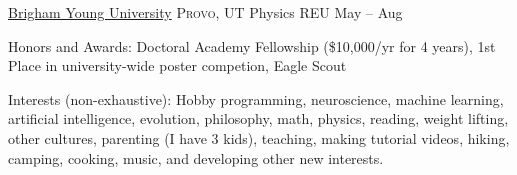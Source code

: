 \documentclass[11pt,a4paper]{article}
\begin{document}
\headedsection
  {\href{http://www.byu.edu}{Brigham Young University}}
  {\textsc{Provo, UT}} {%
	  \headedsubsection
	 {Physics REU}
	 {May  -- Aug }
	 {}
}

\spacedhrule{0.2em}{0.2em}  %

\inlineheadsection
  {Honors and Awards:}
  {Doctoral Academy Fellowship (\$10,000/yr for 4 years),  1st Place in university-wide poster competion, Eagle Scout}

\inlineheadsection
  {Interests (non-exhaustive):}
  {Hobby programming, neuroscience, machine learning, artificial intelligence, evolution, philosophy, math, physics, reading,  weight lifting, other cultures, parenting (I have 3 kids), teaching, making tutorial videos, hiking, camping, cooking, music, and developing other new interests.}
\end{document}
